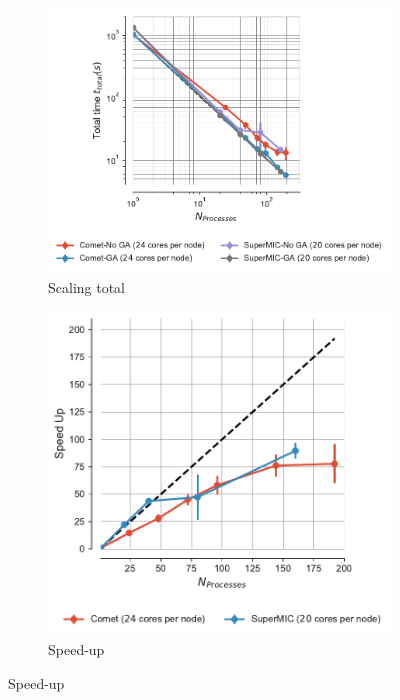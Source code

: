 \begin{figure}[!htb]
  \centering
  \begin{subfigure}{.49\textwidth}
    \includegraphics[width=\linewidth]{figures/Comparison_t-tot-clusters_Splitting.pdf}
    \caption{Scaling total}
    \label{fig:MPIscaling-clusters-splitting}
  \end{subfigure}
  \hfill
  \begin{subfigure}{.49\textwidth}
    \includegraphics[width=\linewidth]{figures/Comparison_speed-up-clusters_Splitting.pdf}
    \caption{Speed-up}
    \label{fig:MPIspeedup-clusters-splitting}
  \end{subfigure}
  \bigskip


\end{figure}

